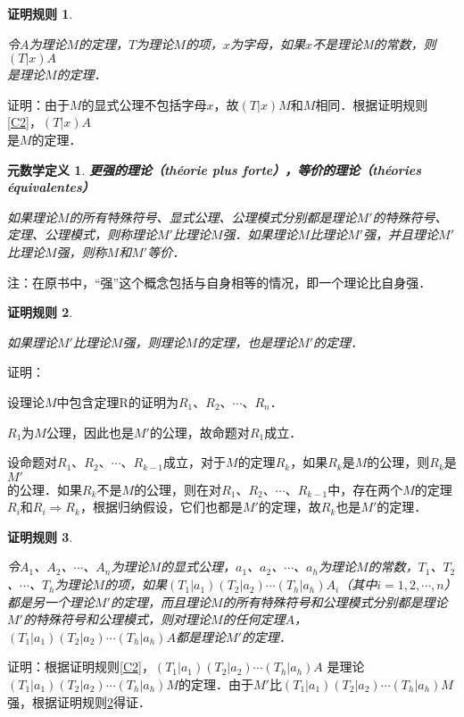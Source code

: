 \documentclass[12pt, a4paper, oneside]{book}
\newtheorem{metadef}{元数学定义}
\newtheorem{C}{证明规则}
\begin{document}
			\begin{C}\label{C3}
				\hfill\par
				令$A$为理论$M$的定理，$T$为理论$M$的项，$x$为字母，如果$x$不是理论M的常数，则$(T|x)A$\\是理论$M$的定理．
			\end{C}				
			证明：由于$M$的显式公理不包括字母$x$，故$(T|x)M$和$M$相同．根据证明规则\ref{C2}，$(T|x)A$\\是$M$的定理．

			\begin{metadef}
				\textbf{更强的理论（théorie plus forte），等价的理论（théories \\équivalentes）}
				\par
				如果理论$M$的所有特殊符号、显式公理、公理模式分别都是理论$M'$的特殊符号、定理、公理模式，则称理论$M'$比理论$M$强．如果理论$M$比理论$M'$强，并且理论$M'$比理论$M$强，则称$M$和$M'$等价．
			\end{metadef}
			注：在原书中，“强”这个概念包括与自身相等的情况，即一个理论比自身强．
			
			\begin{C}\label{C4}		
				\hfill\par
				如果理论$M'$比理论$M$强，则理论$M$的定理，也是理论$M'$的定理．
			\end{C}		
			证明：
			\par
			设理论$M$中包含定理R的证明为$R_1$、$R_2$、$\cdots$、$R_n$．
			\par
			$R_1$为$M$公理，因此也是$M'$的公理，故命题对$R_1$成立．
			\par
			设命题对$R_1$、$R_2$、$\cdots$、$R_{k-1}$成立，对于$M$的定理$R_k$，如果$R_k$是$M$的公理，则$R_k$是$M'$\\的公理．如果$R_k$不是$M$的公理，则在对$R_1$、$R_2$、$\cdots$、$R_{k-1}$中，存在两个$M$的定理$R_i$和$R_i\Rightarrow R_k$，根据归纳假设，它们也都是$M'$的定理，故$R_k$也是$M'$的定理．

			\begin{C}\label{C5}		
				\hfill\par
				令$A_1$、$A_2$、$\cdots$、$A_n$为理论$M$的显式公理，$a_1$、$a_2$、$\cdots$、$a_h$为理论$M$的常数，$T_1$、$T_2$、$\cdots$、$T_h$为理论$M$的项，如果$(T_1|a_1)(T_2|a_2)\cdots(T_h|a_h)A_i$（其中$i=1, 2, \cdots, n$）都是另一个理论$M'$的定理，而且理论$M$的所有特殊符号和公理模式分别都是理论$M'$的特殊符号和公理模式，则对理论$M$的任何定理$A$，$(T_1|a_1)(T_2|a_2)\cdots(T_h|a_h)A$都是理论$M'$的定理．
			\end{C}		
			证明：根据证明规则\ref{C2}，$(T_1|a_1)(T_2|a_2)\cdots(T_h|a_h)A$ 是理论$(T_1|a_1)(T_2|a_2)\cdots(T_h|a_h)M$的定理．由于$M'$比$(T_1|a_1)(T_2|a_2)\cdots(T_h|a_h)M$强，根据证明规则\ref{C4}得证．
\end{document}
